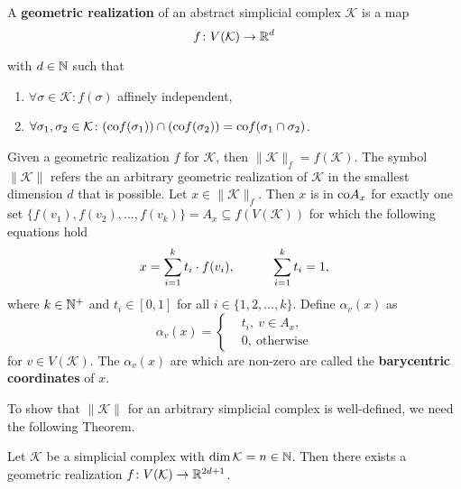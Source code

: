 \begin{defin}
  A \textbf{geometric realization} of an abstract simplicial complex $\mathcal{K}$ is a map
  \begin{equation*}
    f\colon V(\mathcal{K}) \to \mathbb{R}^d
  \end{equation*}

  with $d \in \mathbb{N}$ such that
  \begin{enumerate}
    \item $\forall \sigma \in \mathcal{K}\colon f(\sigma)$ affinely independent,
    \item $\forall \sigma_1, \sigma_2\in \mathcal{K}\colon ({\rm co}f(\sigma_1)) \cap ({\rm co} f(\sigma_2)) = {\rm co}f(\sigma_1 \cap \sigma_2)$.
  \end{enumerate}
    Given a geometric realization $f$ for $\mathcal{K}$, then $\lVert \mathcal{K} \rVert_f = f(\mathcal{K})$. The symbol $\lVert \mathcal{K} \rVert$ refers the an arbitrary geometric realization of $\mathcal{K}$ in the smallest dimension $d$ that is possible.
    Let $x \in \lVert \mathcal{K} \rVert_f$. Then $x$ is in ${\rm co}A_x$ for exactly one set $\{f(v_1), f(v_2), \ldots, f(v_k)\} = A_x \subseteq f(V(\mathcal{K}))$ for which the following equations hold 
    \begin{equation*}
      x = \sum\limits_{i=1}^k t_i \cdot f(v_i), \hspace*{30px} \sum\limits_{i=1}^k t_i = 1, 
    \end{equation*}
    where $k\in \mathbb{N}^+$ and $t_i \in [0, 1]$ for all $i \in \{1, 2, \ldots, k\}$. Define $\alpha_v(x)$ as
    \begin{equation*}
      \alpha_v(x) = \begin{cases}
        &t_i, \: v \in A_x, \\
        &0, \: \text{otherwise}
      \end{cases}
    \end{equation*}
    for $v \in V(\mathcal{K})$.
    The $\alpha_v(x)$ are which are non-zero are called the \textbf{barycentric coordinates} of $x$.
\end{defin} 

To show that $\lVert \mathcal{K} \rVert$ for an arbitrary simplicial complex is well-defined, we need the following Theorem.

\begin{thm}
  Let $\mathcal{K}$ be a simplicial complex with $\dim \mathcal{K} = n \in \mathbb{N}$. Then there exists a geometric realization $f\colon V(\mathcal{K}) \to \mathbb{R}^{2d+1}$.
\end{thm}

